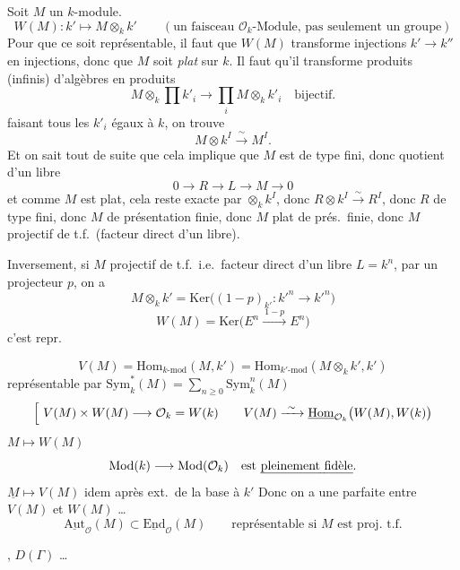 \documentclass[11pt,a4paper]{article}
\begin{document}
Soit $M$ un $k$-module.
\[
  W(M) : k' \longmapsto M \otimes_k k' \qquad (\text{un faisceau } \mathcal{O}_k\text{-Module, pas seulement un groupe})
\]
Pour que ce soit représentable, il faut que $W(M)$ transforme injections $k' \to k''$ en injections, donc que $M$ soit \emph{plat} sur $k$. \struck{\ill{}} Il faut qu'il transforme produits (infinis) d'algèbres en produits
\[
  M \otimes_k \prod k'_i \longrightarrow \prod_i M \otimes_k k'_i \quad \text{bijectif.}
\]
 faisant tous les $k'_i$ égaux à $k$, on trouve
\[
  M \otimes k^I \xrightarrow{\ \sim\ } M^I .
\]
Et on sait tout de suite que cela implique que $M$ est de type fini, donc \struck{\ill{}} quotient d'un libre  
\[
  0 \to R \to L \to M \to 0
\]
\struck{\ill{}} et comme $M$ est plat, cela reste exacte par $\otimes_k k^I$, donc $R \otimes k^I \xrightarrow{\sim} R^I$, donc $R$ de type fini, donc $M$ de présentation finie, donc $M$ plat de prés.\ finie, donc $M$ projectif de t.f.\ (facteur direct d'un libre).

Inversement, si $M$ projectif de t.f.\ i.e.\ facteur direct d'un libre $L = k^n$, par un projecteur $p$, on a
\[
  M \otimes_k k' = \mathrm{Ker}\bigl((1 - p)_{k'} : k'^n \to k'^n\bigr)
\]
\[
  W(M) = \mathrm{Ker}\bigl(E^n \xrightarrow{\ 1-p\ } E^n\bigr)
\]
c'est repr.

\[
  V(M) = \mathrm{Hom}_{k\text{-mod}}(M, k') = \mathrm{Hom}_{k'\text{-mod}}(M \otimes_k k', k')
\]
 représentable par $\mathrm{Sym}^{*}_k(M) = \sum_{n \geqslant 0} \mathrm{Sym}^{n}_k(M)$
\[
  \Bigl[\ V(M) \times W(M) \longrightarrow \mathcal{O}_k = W(k) \qquad V(M) \xrightarrow{\ \sim\ } \underline{\mathrm{Hom}}_{\mathcal{O}_k}\bigl(W(M), W(k)\bigr)
\]
 \quad $M \longmapsto W(M)$
\[
  \mathrm{Mod}(k) \longrightarrow \mathrm{Mod}(\mathcal{O}_k) \quad \text{est \emph{pleinement fidèle}.}
\]
 \quad $\underline{M} \longmapsto V(M)$ \qquad idem après ext.\ de la base à $k'$
 \struck{\ill{}} Donc on a une  parfaite entre $V(M)$ et $W(M)$ …
\[
  \underline{\mathrm{Aut}}_{\mathcal{O}}(M) \subset \underline{\mathrm{End}}_{\mathcal{O}}(M) \qquad \text{représentable si } M \text{ est proj.\ t.f.}
\]

, $D(\Gamma)$ …
\end{document}
